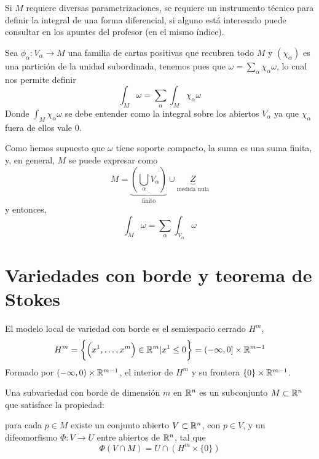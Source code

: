 \begin{obs}
    Si $M$ requiere diversas parametrizaciones, se requiere un instrumento t\'ecnico para definir la integral de una forma diferencial,
    si alguno está interesado puede consultar en los apuntes del profesor (en el mismo índice).
\end{obs}

\begin{defi}
    Sea $\phi_\alpha \colon V_\alpha \to M$ una familia de cartas positivas que recubren todo $M$ y $\left( \chi_\alpha \right)$ es una
    partición de la unidad subordinada, tenemos pues que $\omega = \sum\limits_\alpha \chi_\alpha \omega$, lo cual nos permite definir
    \[
        \int_M \omega = \sum_\alpha \int_M \chi_\alpha \omega
    \]
    Donde $\int_M \chi_\alpha \omega$ se debe entender como la integral sobre los abiertos $V_\alpha$ ya que $\chi_\alpha$ fuera de ellos vale
    0.
\end{defi}

\begin{obs}
    Como hemos supuesto que $\omega$ tiene soporte compacto, la suma es una suma finita, y, en general, $M$ se puede expresar como
    \[
        M = \underbrace{\left( \bigcup_\alpha V_\alpha \right)}_{\text{finito}} \cup \underbrace{Z}_{\text{medida nula}}
    \]
    y entonces,
    \[
        \int_M \omega = \sum_\alpha \int_{V_\alpha} \omega
    \]
\end{obs}

\section{Variedades con borde y teorema de Stokes}\label{section:5-8}

\begin{obs}
    El modelo local de variedad con borde es el semiespacio cerrado $H^m$,
    \[
        H^m = \left\{\left( x^1, \dots, x^m \right) \in \mathbb{R}^m \vert x^1 \leq 0\right\} = (-\infty, 0] \times \mathbb{R}^{m-1}
    \]
    Formado por $(-\infty, 0) \times \mathbb{R}^{m-1}$, el interior de $H^m$ y su frontera $\{0\} \times \mathbb{R}^{m-1}$.
\end{obs}

\begin{defi}
    Una subvariedad con borde de dimensión $m$ en $\mathbb{R}^n$ es un subconjunto $M \subset \mathbb{R}^n$ que satisface
    la propiedad:

    para cada $p \in M$ existe un conjunto abierto $V \subset \mathbb{R}^n$, con $p \in V$, y un difeomorfismo
    $\Phi \colon V \to U$ entre abiertos de $\mathbb{R}^n$, tal que
    \[
        \Phi\left( V \cap M \right) = U \cap \left( H^m \times \{0\}\right)
    \]
\end{defi}


